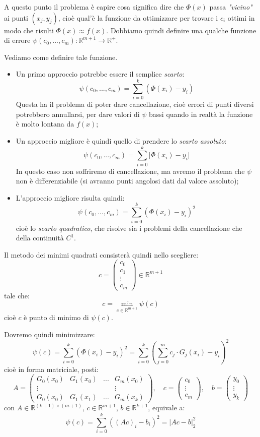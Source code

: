 \documentclass[a4paper,11pt]{article}
\begin{document}
\par\smallskip

A questo punto il problema è capire cosa significa dire che $\Phi(x)$ passa \textit{"vicino"} ai punti $(x_j, y_j)$, cioè qual'è la funzione da ottimizzare per trovare i $c_i$ ottimi in modo che risulti $\Phi(x) \approx f(x)$.
Dobbiamo quindi definire una qualche funzione di errore $\psi(c_0, ..., c_m) : \mathbb{R}^{m + 1} \rightarrow \mathbb{R}^+$.

Vediamo come definire tale funzione.
\begin{itemize}
	\item Un primo approccio potrebbe essere il semplice \textit{scarto}:
		$$
		\psi(c_0, ..., c_m) = \sum_{i = 0}^k \left( \Phi(x_i) - y_i \right)
		$$
		Questa ha il problema di poter dare cancellazione, cioè errori di punti diversi potrebbero annullarsi, per dare valori di $\psi$ bassi quando in realtà la funzione è molto lontana da $f(x)$;
	\item Un approccio migliore è quindi quello di prendere lo \textit{scarto assoluto}:
		$$
		\psi(c_0, ..., c_m) = \sum_{i = 0}^k \Big| \Phi(x_i) - y_i \Big|
		$$
		In questo caso non soffriremo di cancellazione, ma avremo il problema che $\psi$ non è differenziabile (si avranno punti angolosi dati dal valore assoluto);
	\item L'approccio migliore risulta quindi:
		$$
		\psi(c_0, ..., c_m) = \sum_{i = 0}^k \left( \Phi(x_i) - y_i \right)^2
		$$
		cioè lo \textit{scarto quadratico}, che risolve sia i problemi della cancellazione che della continuità $C^1$.
\end{itemize}

Il metodo dei minimi quadrati consisterà quindi nello scegliere:
$$
c = 
\begin{pmatrix}
	c_0 \\ c_1 \\ \vdots \\ c_m
\end{pmatrix}
\in \mathbb{R}^{m + 1}
$$
tale che:
$$
c = \min_{c \in \mathbb{R}^{m + 1}} \psi(c)
$$
cioè $c$ è punto di minimo di $\psi(c)$.

Dovremo quindi minimizzare:
$$
\psi(c) = \sum_{i = 0}^k \left( \Phi(x_i) - y_i \right)^2 = \sum_{i = 0}^k \left( \sum_{j = 0}^m c_j \cdot G_j(x_i) - y_i \right)^2
$$
cioè in forma matriciale, posti:
$$
A =
\begin{pmatrix}
	G_0(x_0) & G_1(x_0) & ... & G_m(x_0) \\
	\vdots & & & \vdots \\
	G_0(x_0) & G_1(x_1) & ... & G_m(x_k)
\end{pmatrix}, \quad
c =
\begin{pmatrix}
	c_0 \\ \vdots \\ c_m
\end{pmatrix}, \quad
b = 
\begin{pmatrix}
	y_0 \\ \vdots \\ y_k
\end{pmatrix}
$$
con $A \in \mathbb{R}^{ (k + 1) \times (m + 1) }$, $c \in \mathbb{R}^{m + 1}$, $b \in \mathbb{R}^{k + 1}$, equivale a:
$$
\psi(c) = \sum_{i = 0}^k \left( (Ac)_i - b_i \right)^2 = \Big| Ac - b \Big|_2^2
$$
\end{document}
